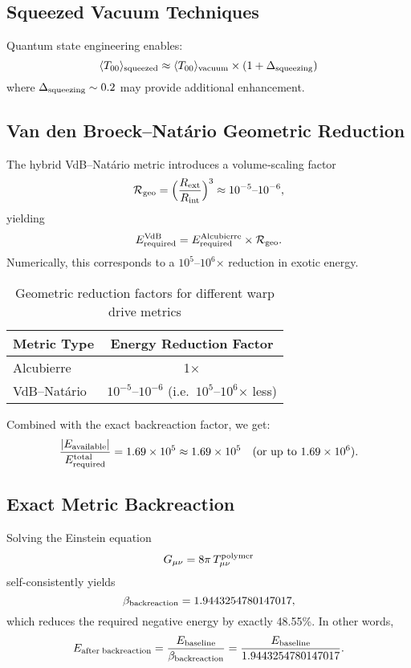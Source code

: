 \documentclass[11pt]{article}
\begin{document}
\subsection{Squeezed Vacuum Techniques}
Quantum state engineering enables:
\[
  \langle T_{00} \rangle_{\rm squeezed} \approx \langle T_{00} \rangle_{\rm vacuum} \times (1 + \Delta_{\rm squeezing})
\]
where $\Delta_{\rm squeezing} \sim 0.2$ may provide additional enhancement.

\subsection{Van den Broeck–Natário Geometric Reduction}
The hybrid VdB–Natário metric introduces a volume‐scaling factor
\[
  \mathcal{R}_{\rm geo} 
  = \Bigl(\frac{R_{\rm ext}}{R_{\rm int}}\Bigr)^3 
  \approx 10^{-5}\text{–}10^{-6},
\]
yielding
\[
  E_{\rm required}^{\rm VdB} 
  = E_{\rm required}^{\rm Alcubierre} \times \mathcal{R}_{\rm geo}.
\]
Numerically, this corresponds to a \(10^5\)–\(10^6\)× reduction in exotic energy.

\begin{table}[h]
\centering
\begin{tabular}{@{}lc@{}}
\toprule
Metric Type      & Energy Reduction Factor \\
\midrule
Alcubierre        & 1× \\
VdB–Natário       & \(10^{-5}\)–\(10^{-6}\) (i.e.\ \(10^5\)–\(10^6\)× less) \\
\bottomrule
\end{tabular}
\caption{Geometric reduction factors for different warp drive metrics}
\end{table}

Combined with the exact backreaction factor, we get:
\[
  \frac{|E_{\rm available}|}{E_{\rm required}^{\rm total}}
  = 1.69 \times 10^5 \approx 1.69\times10^5 \quad (\text{or up to }1.69\times10^6).
\]

\subsection{Exact Metric Backreaction}
Solving the Einstein equation
\[
  G_{\mu\nu} = 8\pi\,T_{\mu\nu}^{\rm polymer}
\]
self-consistently yields
\[
  \beta_{\rm backreaction} = 1.9443254780147017,
\]
which reduces the required negative energy by exactly 48.55\%.  In other words,
\[
  E_{\rm after\;backreaction}
  = \frac{E_{\rm baseline}}{\beta_{\rm backreaction}} 
  = \frac{E_{\rm baseline}}{1.9443254780147017}.
\]
\end{document}
